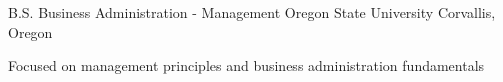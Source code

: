 

\begin{cventries}

  \cventry
    {B.S. Business Administration - Management} %
    {Oregon State University} %
    {Corvallis, Oregon} %
    {} %
    {
      \begin{cvitems} %
        \item {Focused on management principles and business administration fundamentals}
      \end{cvitems}
    }

\end{cventries}
